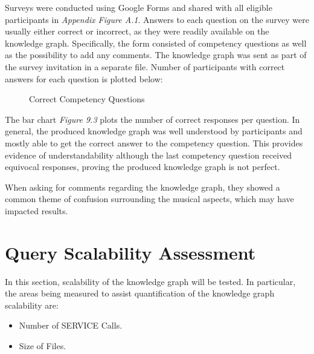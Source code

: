 Surveys were conducted using Google Forms and shared with all eligible participants in \textit{Appendix Figure A.1}. Answers to each question on the survey were usually either correct or incorrect, as they were readily available on the knowledge graph. Specifically, the form consisted of competency questions as well as the possibility to add any comments. The knowledge graph was sent as part of the survey invitation in a separate file. Number of participants with correct answers for each question is plotted below: 

\pgfplotsset{compat=1.18}
\begin{figure}[H]
\begin{center}
\end{center}
\vspace{-0.8cm}
\caption{Correct Competency Questions}
\end{figure}
\vspace{-0.15cm}

The bar chart \textit{Figure 9.3} plots the number of correct responses per question. In general, the produced knowledge graph was well understood by participants and mostly able to get the correct answer to the competency question. This provides evidence of understandability although the last competency question received equivocal responses, proving the produced knowledge graph is not perfect. 

When asking for comments regarding the knowledge graph, they showed a common theme of confusion surrounding the musical aspects, which may have impacted results. 

\section{Query Scalability Assessment}
In this section, scalability of the knowledge graph will be tested. In particular, the areas being measured to assist quantification of the knowledge graph scalability are: 

\vspace{-0.1cm}
\begin{itemize}
\itemsep0cm
    \item Number of SERVICE Calls.
    \vspace{-0.1cm}
    \item Size of Files.
\end{itemize}
\vspace{-0.1cm}


